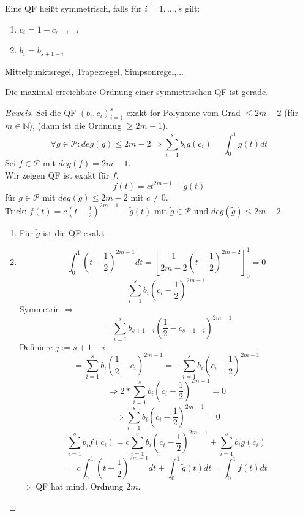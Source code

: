 \begin{definition}
Eine QF heißt symmetrisch, falls für $i = 1,...,s$ gilt:
\begin{enumerate}
  \item $c_i = 1 - c_{s+1-i}$
  \item $b_i = b_{s+1-i}$
\end{enumerate}
\end{definition}

\begin{example}[Symmetrische QF]
Mittelpunktsregel, Trapezregel, Simpsonregel,...
\end{example}

\begin{theorem}
Die maximal erreichbare Ordnung einer symmetrischen QF ist gerade.
\begin{proof}[Beweis]
Sei die QF $(b_i,c_i)_{i=1}^{s}$ exakt for Polynome vom Grad $\leq 2m-2$ (für $m \in \mathbb{N}$), (dann ist die Ordnung $\geq 2m-1$).
$$\forall g \in \mathcal{P}: deg(g) \leq 2m-2 \Rightarrow \sum_{i=1}^{s} b_i g(c_i) = \int_{0}^{1} g(t) dt$$
Sei $f \in \mathcal{P}$ mit $deg(f) = 2m-1$. \\
Wir zeigen QF ist exakt für $f$. 
$$f(t) = ct^{2m-1} + g(t)$$
für $g \in \mathcal{P}$ mit $deg(g) \leq 2m-2$ mit $c \neq 0$. \\
Trick: $f(t) = c(t-\frac{1}{2})^{2m-1} + \tilde{g}(t)$ mit $\tilde{g} \in \mathcal{P}$ und $deg(\tilde{g}) \leq 2m-2$

\begin{enumerate}
  \item Für $\tilde{g}$ ist die QF exakt
  \item $$\int_0^1 (t-\frac{1}{2})^{2m-1} dt = \left[\frac{1}{2m-2}\left(t-\frac{1}{2}\right)^{2m-2}\right]_0^1 = 0$$
  $$ \sum_{i=1}^{s} b_i \left(c_i - \frac{1}{2}\right)^{2m-1}$$ 
  Symmetrie $\Rightarrow$
  $$= \sum_{i=1}^{s} b_{s+1-i} \left(\frac{1}{2} - c_{s+1-i}\right)^{2m-1} $$
  Definiere $j := s+1-i$
  $$ = \sum_{i=1}^{s} b_i \left(\frac{1}{2} - c_i\right)^{2m-1} = -\sum_{i=1}^{s} b_i \left(c_i - \frac{1}{2}\right)^{2m-1}$$
  $$\Rightarrow 2*\sum_{i=1}^{s} b_i (c_i - \frac{1}{2})^{2m-1} = 0$$
  $$\Rightarrow \sum_{i=1}^{s} b_i \left(c_i - \frac{1}{2}\right)^{2m-1} = 0$$
  $$\sum_{i=1}^{s}b_if(c_i) = c \sum_{i=1}^{s}b_i\left(c_i-\frac{1}{2}\right)^{2m-1} + \sum_{i=1}^{s}b_i\tilde{g}(c_i)$$
  $$ = c\int_0^1\left(t-\frac{1}{2}\right)^{2m-1} dt + \int_0^1 \tilde{g}(t)dt = \int_0^1 f(t)dt$$
  $\Rightarrow$ QF hat mind. Ordnung $2m$.
\end{enumerate}
\end{proof}
\end{theorem}

